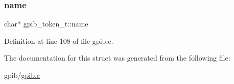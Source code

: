 \subsubsection{\texorpdfstring{name}{name}}
{\footnotesize\ttfamily char$\ast$ gpib\+\_\+token\+\_\+t\+::name}



Definition at line 108 of file gpib.\+c.



The documentation for this struct was generated from the following file\+:\begin{DoxyCompactItemize}
\item 
gpib/\hyperlink{gpib_8c}{gpib.\+c}\end{DoxyCompactItemize}
